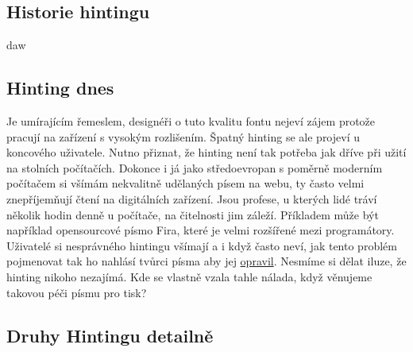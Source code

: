 \documentclass[a4paper]{article}
\begin{document}
\subsection{Historie hintingu}
daw

\subsection{Hinting dnes}

Je umírajícím řemeslem, designéři o tuto kvalitu fontu nejeví zájem protože pracují na zařízení s vysokým rozlišením. Špatný hinting se ale projeví u koncového uživatele. Nutno přiznat, že hinting není tak potřeba jak dříve při užití na stolních počítačích. Dokonce i já jako středoevropan s poměrně moderním počítačem si všímám nekvalitně udělaných písem na webu, ty často velmi znepříjemňují čtení na digitálních zařízení. Jsou profese, u kterých lidé tráví několik hodin denně u počítače, na čitelnosti jim záleží. Příkladem může být například opensourcové písmo Fira, které je velmi rozšířené mezi programátory. Uživatelé si nesprávného hintingu všímají a i když často neví, jak tento problém pojmenovat tak ho nahlásí tvůrci písma aby jej \href{https://github.com/tonsky/FiraCode/issues?utf8=%E2%9C%93&q=hinting}{opravil}. Nesmíme si dělat iluze, že hinting nikoho nezajímá. Kde se vlastně vzala tahle nálada, když věnujeme takovou péči písmu pro tisk?


\subsection{Druhy Hintingu detailně}
\end{document}
